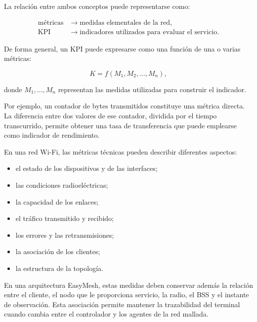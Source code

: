 La relación entre ambos conceptos puede representarse como:

\[
\begin{aligned}
    \text{métricas}
    &\longrightarrow
    \text{medidas elementales de la red},\\
    \text{KPI}
    &\longrightarrow
    \text{indicadores utilizados para evaluar el servicio}.
\end{aligned}
\]

De forma general, un KPI puede expresarse como una función de una o
varias métricas:

\[
    K =
    f
    \left(
        M_1,
        M_2,
        \ldots,
        M_n
    \right),
\]

donde \(M_1,\ldots,M_n\) representan las medidas utilizadas para
construir el indicador.

Por ejemplo, un contador de bytes transmitidos constituye una métrica
directa. La diferencia entre dos valores de ese contador, dividida por el
tiempo transcurrido, permite obtener una tasa de transferencia que puede
emplearse como indicador de rendimiento.

En una red Wi-Fi, las métricas técnicas pueden describir diferentes
aspectos:

\begin{itemize}
    \item el estado de los dispositivos y de las interfaces;

    \item las condiciones radioeléctricas;

    \item la capacidad de los enlaces;

    \item el tráfico transmitido y recibido;

    \item los errores y las retransmisiones;

    \item la asociación de los clientes;

    \item la estructura de la topología.
\end{itemize}

En una arquitectura EasyMesh, estas medidas deben conservar además la
relación entre el cliente, el nodo que le proporciona servicio, la radio,
el BSS y el instante de observación. Esta asociación permite mantener la
trazabilidad del terminal cuando cambia entre el controlador y los
agentes de la red mallada.

